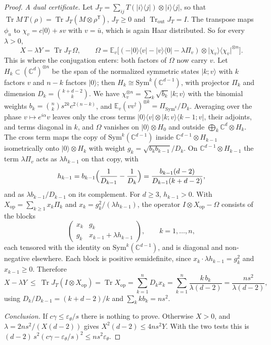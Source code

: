 \documentclass[11pt]{article}
\theoremstyle{remark}
\newcommand{\ket}[1]{\lvert #1 \rangle}
\newcommand{\bra}[1]{\langle #1 \rvert}
\newcommand{\proj}[1]{\lvert #1 \rangle\langle #1 \rvert}
\newcommand{\Sym}{\mathrm{Sym}}
\begin{document}
\begin{proof}
\emph{A dual certificate.} Let $J_T = \sum_{ij} T(\ket{i}\bra{j}) \otimes \ket{i}\bra{j}$, so that $\operatorname{Tr} M\,T(\rho) = \operatorname{Tr} J_T(M \otimes \rho^{\mathsf T})$, $J_T \ge 0$ and $\operatorname{Tr}_{\mathrm{out}} J_T = I$. The transpose maps $\phi_u$ to $\chi_v = c\ket{0} + s v$ with $v = \bar u$, which is again Haar distributed. So for every $\lambda > 0$,
\[
X - \lambda Y = \operatorname{Tr} J_T\,\Omega, \qquad \Omega = \mathbb{E}_v\bigl[(-\ket{0}\bra{v} - \ket{v}\bra{0} - \lambda\Pi_v) \otimes \proj{\chi_v}^{\otimes n}\bigr].
\]
This is where the conjugation enters: both factors of $\Omega$ now carry $v$. Let $H_k \subset (\mathbb{C}^d)^{\otimes n}$ be the span of the normalized symmetric states $\ket{k;v}$ with $k$ factors $v$ and $n-k$ factors $\ket{0}$; then $H_k \cong \Sym^k(\mathbb{C}^{d-1})$, with projector $\Pi_k$ and dimension $D_k = \binom{k+d-2}{k}$. We have $\chi_v^{\otimes n} = \sum_k \sqrt{b_k}\,\ket{k;v}$ with the binomial weights $b_k = \binom{n}{k}s^{2k}c^{2(n-k)}$, and $\mathbb{E}_v (vv^\dagger)^{\otimes k} = \Pi_{\Sym^k}/D_k$. Averaging over the phase $v \mapsto e^{i\alpha}v$ leaves only the cross terms $\ket{0}\bra{v} \otimes \ket{k;v}\bra{k-1;v}$, their adjoints, and terms diagonal in $k$, and $\Omega$ vanishes on $\ket{0}\otimes H_0$ and outside $\bigoplus_k \mathbb{C}^d \otimes H_k$. The cross term maps the copy of $\Sym^k(\mathbb{C}^{d-1})$ inside $\mathbb{C}^{d-1} \otimes H_{k-1}$ isometrically onto $\ket{0} \otimes H_k$ with weight $g_k = \sqrt{b_k b_{k-1}}/D_k$. On $\mathbb{C}^{d-1}\otimes H_{k-1}$ the term $\lambda\Pi_v$ acts as $\lambda h_{k-1}$ on that copy, with
\[
h_{k-1} = b_{k-1}\Bigl(\frac{1}{D_{k-1}} - \frac{1}{D_k}\Bigr) = \frac{b_{k-1}(d-2)}{D_{k-1}(k+d-2)},
\]
and as $\lambda b_{k-1}/D_{k-1}$ on its complement. For $d \ge 3$, $h_{k-1} > 0$. With $X_{\mathrm{op}} = \sum_{k\ge 1} x_k \Pi_k$ and $x_k = g_k^2/(\lambda h_{k-1})$, the operator $I \otimes X_{\mathrm{op}} - \Omega$ consists of the blocks
\[
\begin{pmatrix} x_k & g_k \\ g_k & x_{k-1} + \lambda h_{k-1}\end{pmatrix}, \qquad k = 1, \dots, n,
\]
each tensored with the identity on $\Sym^k(\mathbb{C}^{d-1})$, and is diagonal and non-negative elsewhere. Each block is positive semidefinite, since $x_k \cdot \lambda h_{k-1} = g_k^2$ and $x_{k-1} \ge 0$. Therefore
\[
X - \lambda Y \ \le\ \operatorname{Tr} J_T (I \otimes X_{\mathrm{op}}) = \operatorname{Tr} X_{\mathrm{op}} = \sum_{k=1}^n D_k x_k = \sum_{k=1}^n \frac{k\,b_k}{\lambda(d-2)} = \frac{n s^2}{\lambda(d-2)},
\]
using $D_k/D_{k-1} = (k+d-2)/k$ and $\sum_k k b_k = ns^2$.

\emph{Conclusion.} If $c\gamma \le \varepsilon_\theta/s$ there is nothing to prove. Otherwise $X > 0$, and $\lambda = 2ns^2/(X(d-2))$ gives $X^2(d-2) \le 4ns^2 Y$. With the two tests this is $(d-2)\,s^2(c\gamma - \varepsilon_\theta/s)^2 \le ns^2\varepsilon_\theta$.
\end{proof}
\end{document}
